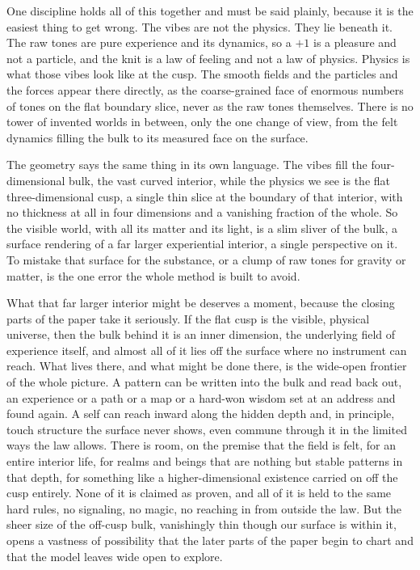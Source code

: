 One discipline holds all of this together and must be said plainly, because it is the easiest thing to get wrong. The vibes are not the physics. They lie beneath it. The raw tones are pure experience and its dynamics, so a $+1$ is a pleasure and not a particle, and the knit is a law of feeling and not a law of physics. Physics is what those vibes look like at the cusp. The smooth fields and the particles and the forces appear there directly, as the coarse-grained face of enormous numbers of tones on the flat boundary slice, never as the raw tones themselves. There is no tower of invented worlds in between, only the one change of view, from the felt dynamics filling the bulk to its measured face on the surface.

The geometry says the same thing in its own language. The vibes fill the four-dimensional bulk, the vast curved interior, while the physics we see is the flat three-dimensional cusp, a single thin slice at the boundary of that interior, with no thickness at all in four dimensions and a vanishing fraction of the whole. So the visible world, with all its matter and its light, is a slim sliver of the bulk, a surface rendering of a far larger experiential interior, a single perspective on it. To mistake that surface for the substance, or a clump of raw tones for gravity or matter, is the one error the whole method is built to avoid.

What that far larger interior might be deserves a moment, because the closing parts of the paper take it seriously. If the flat cusp is the visible, physical universe, then the bulk behind it is an inner dimension, the underlying field of experience itself, and almost all of it lies off the surface where no instrument can reach. What lives there, and what might be done there, is the wide-open frontier of the whole picture. A pattern can be written into the bulk and read back out, an experience or a path or a map or a hard-won wisdom set at an address and found again. A self can reach inward along the hidden depth and, in principle, touch structure the surface never shows, even commune through it in the limited ways the law allows. There is room, on the premise that the field is felt, for an entire interior life, for realms and beings that are nothing but stable patterns in that depth, for something like a higher-dimensional existence carried on off the cusp entirely. None of it is claimed as proven, and all of it is held to the same hard rules, no signaling, no magic, no reaching in from outside the law. But the sheer size of the off-cusp bulk, vanishingly thin though our surface is within it, opens a vastness of possibility that the later parts of the paper begin to chart and that the model leaves wide open to explore.

